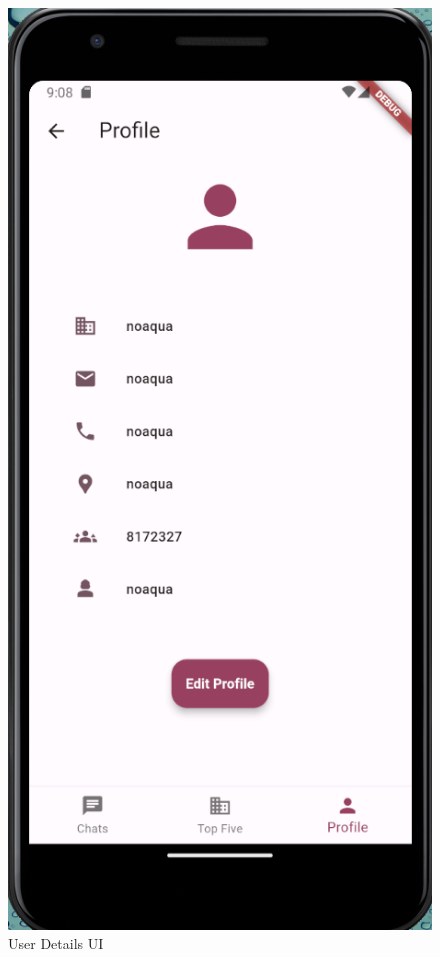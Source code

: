 \begin{figure}[htbp]
    \centering
    \includegraphics[scale=0.4]{pictures/because_it_looks_bad_we_have_ui.png}
    \caption{User Details UI}
    \label{userDetailsUI}
\end{figure}

\label{implementation}

